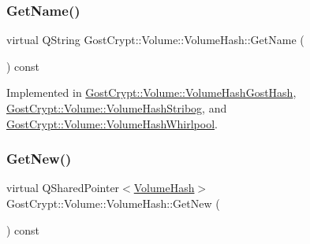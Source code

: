 \mbox{\label{class_gost_crypt_1_1_volume_1_1_volume_hash_ac6a1fa9550857b211a304c305a526355}} 
\subsubsection{\texorpdfstring{Get\+Name()}{GetName()}}
{\footnotesize\ttfamily virtual Q\+String Gost\+Crypt\+::\+Volume\+::\+Volume\+Hash\+::\+Get\+Name (\begin{DoxyParamCaption}{ }\end{DoxyParamCaption}) const\hspace{0.3cm}{\ttfamily [pure virtual]}}



Implemented in \hyperlink{class_gost_crypt_1_1_volume_1_1_volume_hash_gost_hash_a2ee1b3df04a1ae01cfebb0049a5c6b6f}{Gost\+Crypt\+::\+Volume\+::\+Volume\+Hash\+Gost\+Hash}, \hyperlink{class_gost_crypt_1_1_volume_1_1_volume_hash_stribog_a8a6c7c3679703c27e816be9679d44250}{Gost\+Crypt\+::\+Volume\+::\+Volume\+Hash\+Stribog}, and \hyperlink{class_gost_crypt_1_1_volume_1_1_volume_hash_whirlpool_a84fbe785c799795ead9a7154deb54c3c}{Gost\+Crypt\+::\+Volume\+::\+Volume\+Hash\+Whirlpool}.

\mbox{\label{class_gost_crypt_1_1_volume_1_1_volume_hash_a4da6870eedb23e17cf26923478478fa6}} 
\subsubsection{\texorpdfstring{Get\+New()}{GetNew()}}
{\footnotesize\ttfamily virtual Q\+Shared\+Pointer$<$\hyperlink{class_gost_crypt_1_1_volume_1_1_volume_hash}{Volume\+Hash}$>$ Gost\+Crypt\+::\+Volume\+::\+Volume\+Hash\+::\+Get\+New (\begin{DoxyParamCaption}{ }\end{DoxyParamCaption}) const\hspace{0.3cm}{\ttfamily [pure virtual]}}



